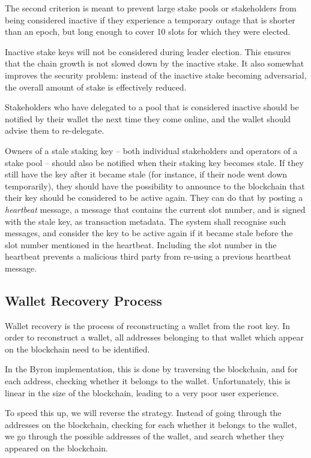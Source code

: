 \documentclass[11pt,a4paper]{article}
\begin{document}
The second criterion is meant to prevent large stake pools or
stakeholders from being considered inactive if they experience a
temporary outage that is shorter than an epoch, but long enough to cover
10 slots for which they were elected.

Inactive stake keys will not be considered during leader election. This
ensures that the chain growth is not slowed down by the inactive stake.
It also somewhat improves the security problem: instead of the inactive
stake becoming adversarial, the overall amount of stake is effectively
reduced.

Stakeholders who have delegated to a pool that is considered inactive
should be notified by their wallet the next time they come online, and
the wallet should advise them to re-delegate.

Owners of a stale staking key -- both individual stakeholders and
operators of a stake pool -- should also be notified when their staking
key becomes stale. If they still have the key after it became stale (for
instance, if their node went down temporarily), they should have the
possibility to announce to the blockchain that their key should be
considered to be active again. They can do that by posting a
\emph{heartbeat} message, a message that contains the current slot
number, and is signed with the stale key, as transaction metadata. The
system shall recognise such messages, and consider the key to be active
again if it became stale before the slot number mentioned in the
heartbeat. Including the slot number in the heartbeat prevents a
malicious third party from re-using a previous heartbeat message.

\subsection{Wallet Recovery Process}
\label{wallet-recovery-process}

Wallet recovery is the process of reconstructing a wallet from the root
key. In order to reconstruct a wallet, all addresses belonging to that
wallet which appear on the blockchain need to be identified.

In the Byron implementation, this is done by traversing the
blockchain, and for each address, checking whether it belongs to the
wallet. Unfortunately, this is linear in the size of the blockchain,
leading to a very poor user experience.

To speed this up, we will reverse the strategy. Instead of going through
the addresses on the blockchain, checking for each whether it belongs to
the wallet, we go through the possible addresses of the wallet, and
search whether they appeared on the blockchain.
\end{document}

